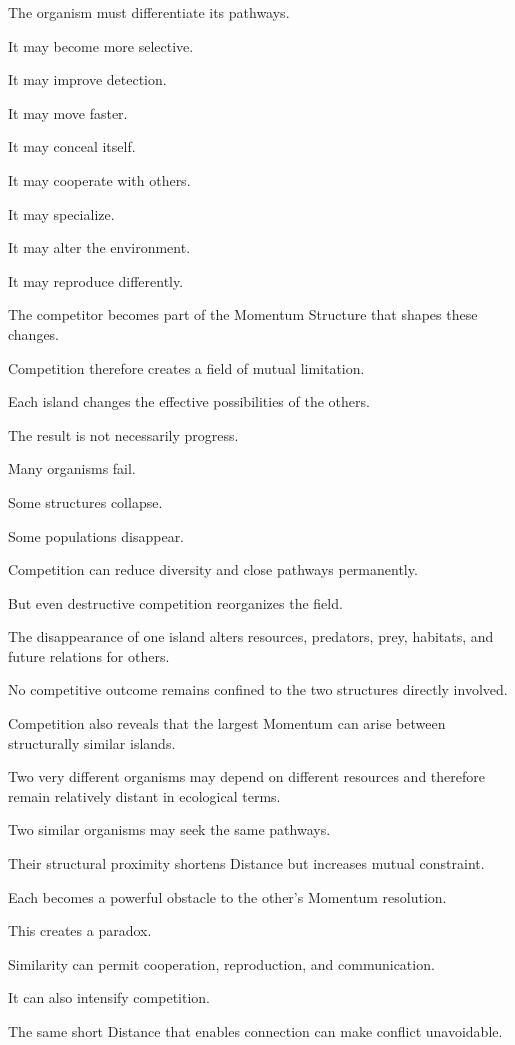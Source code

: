 The organism must differentiate its pathways.

It may become more selective.

It may improve detection.

It may move faster.

It may conceal itself.

It may cooperate with others.

It may specialize.

It may alter the environment.

It may reproduce differently.

The competitor becomes part of the Momentum Structure that shapes these changes.

Competition therefore creates a field of mutual limitation.

Each island changes the effective possibilities of the others.

The result is not necessarily progress.

Many organisms fail.

Some structures collapse.

Some populations disappear.

Competition can reduce diversity and close pathways permanently.

But even destructive competition reorganizes the field.

The disappearance of one island alters resources, predators, prey, habitats, and future relations for others.

No competitive outcome remains confined to the two structures directly involved.

Competition also reveals that the largest Momentum can arise between structurally similar islands.

Two very different organisms may depend on different resources and therefore remain relatively distant in ecological terms.

Two similar organisms may seek the same pathways.

Their structural proximity shortens Distance but increases mutual constraint.

Each becomes a powerful obstacle to the other’s Momentum resolution.

This creates a paradox.

Similarity can permit cooperation, reproduction, and communication.

It can also intensify competition.

The same short Distance that enables connection can make conflict unavoidable.

